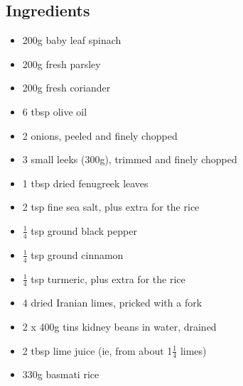 \documentclass{book}
\begin{document}
\subsection*{Ingredients}
\begin{itemize}
\item 200g baby leaf spinach
\item 200g fresh parsley
\item 200g fresh coriander
\item 6 tbsp olive oil
\item 2 onions, peeled and finely chopped
\item 3 small leeks (300g), trimmed and finely chopped
\item 1 tbsp dried fenugreek leaves
\item 2 tsp fine sea salt, plus extra for the rice
\item $\frac{1}{4}$ tsp ground black pepper
\item $\frac{1}{4}$ tsp ground cinnamon
\item $\frac{1}{4}$ tsp turmeric, plus extra for the rice
\item 4 dried Iranian limes, pricked with a fork
\item 2 x 400g tins kidney beans in water, drained
\item 2 tbsp lime juice (ie, from about 1$\frac{1}{4}$ limes)
\item 330g basmati rice
\end{itemize}
\end{document}
